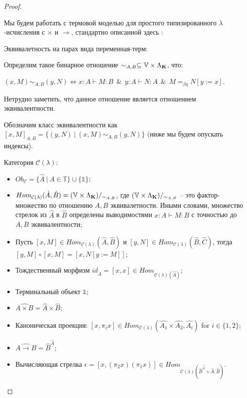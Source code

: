 \begin{proof}

$ $

Мы будем работать с термовой моделью для простого типизированного $\lambda$-исчисления с $\times$ и $\to$, стандартно описанной здесь \cite{LambekScott}:

\begin{defin} Эквивалетность на парах вида переменная-терм:
  $ $

  Определим такое бинарное отношение  $\sim_{A, B} \subseteq \mathbb{V} \times \Lambda_{{\bf K}}$, что:

  $(x, M) \sim_{A, B} (y, N) \Leftrightarrow x : A \vdash M : B \:\: \& \:\: y : A \vdash N : A \:\: \& \:\: M =_{\beta \eta} N [y := x]$.
\end{defin}

Нетрудно заметить, что данное отношение является отношением эквивалентности.

Обозначим класс эквивалентности как $[x, M]_{A, B} = \{ (y, N) \: | \: (x, M) \sim_{A, B} (y, N) \}$
(ниже мы будем опускать индексы).


\begin{defin} Категория $\mathcal{C}(\lambda)$:
\begin{itemize}
  \item $Ob_{\mathcal{C}} = \{ \hat{A} \: | \: A \in \mathbb{T} \} \cup \{ \mathds{1} \}$;
  \item $Hom_{\mathcal{C}(\lambda)}(\hat{A},\hat{B}) = (\mathbb{V} \times \Lambda_{{\bf K}})/_{\sim_{A, B}}$, где $(\mathbb{V} \times \Lambda_{{\bf K}})/_{\sim_{A, B}}$ -- это фактор-множество по отношению $A, B$ эквивалетности.
  Иными словами, множество стрелок из $\hat{A}$ в $\hat{B}$ определены выводимостями $x : A \vdash M : B$ с точностью до $A, B$ эквивалентности;
  \item Пусть $[x, M] \in Hom_{\mathcal{C}(\lambda)}(\hat{A},\hat{B})$ и $[y,N] \in Hom_{\mathcal{C}(\lambda)}(\hat{B},\hat{C})$, тогда $[y,M] \circ [x, M] = [x, N [y := M]]$;
  \item Тождественный морфизм $id_{\hat{A}} = [x,x] \in Hom_{\mathcal{C}(\lambda)(\hat{A})}$;
  \item Терминальный объект $\mathds{1}$;
  \item $\widehat{A \times B} = \hat{A} \times \hat{B}$;
  \item Каноническая проекция: $[x, \pi_i x] \in Hom_{\mathcal{C}(\lambda)}(\hat{A_1} \times \hat{A_2},\hat{A_i})$ for $i \in \{ 1, 2 \}$;
  \item $\widehat{A \to B} = \hat{B}^{\hat{A}}$;
  \item Вычисляющая стрелка $\epsilon = [x, (\pi_2 x) (\pi_1 x)] \in Hom_{\mathcal{C}(\lambda)(\hat{B}^{\hat{A}} \times \hat{A}, \hat{B})}$.
\end{itemize}
\end{defin}


\end{proof}

